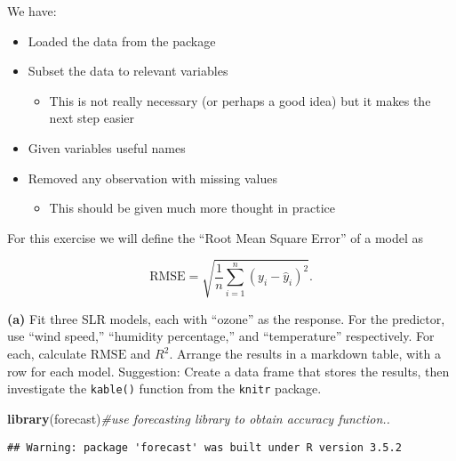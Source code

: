 \documentclass[]{article}
\newenvironment{Shaded}{\begin{snugshade}}{\end{snugshade}}
\newcommand{\KeywordTok}[1]{\textcolor[rgb]{0.13,0.29,0.53}{\textbf{#1}}}
\newcommand{\CommentTok}[1]{\textcolor[rgb]{0.56,0.35,0.01}{\textit{#1}}}
\newcommand{\NormalTok}[1]{#1}
\providecommand{\tightlist}{%
  \setlength{\itemsep}{0pt}\setlength{\parskip}{0pt}}
\begin{document}
We have:

\begin{itemize}
\tightlist
\item
  Loaded the data from the package
\item
  Subset the data to relevant variables

  \begin{itemize}
  \tightlist
  \item
    This is not really necessary (or perhaps a good idea) but it makes
    the next step easier
  \end{itemize}
\item
  Given variables useful names
\item
  Removed any observation with missing values

  \begin{itemize}
  \tightlist
  \item
    This should be given much more thought in practice
  \end{itemize}
\end{itemize}

For this exercise we will define the ``Root Mean Square Error'' of a
model as

\[
\text{RMSE} = \sqrt{\frac{1}{n} \sum_{i = 1}^{n}(y_i - \hat{y}_i)^2}.
\]

\textbf{(a)} Fit three SLR models, each with ``ozone'' as the response.
For the predictor, use ``wind speed,'' ``humidity percentage,'' and
``temperature'' respectively. For each, calculate \(\text{RMSE}\) and
\(R^2\). Arrange the results in a markdown table, with a row for each
model. Suggestion: Create a data frame that stores the results, then
investigate the \texttt{kable()} function from the \texttt{knitr}
package.

\begin{Shaded}
\begin{Highlighting}[]
\KeywordTok{library}\NormalTok{(forecast)}\CommentTok{#use forecasting library to obtain accuracy function..}
\end{Highlighting}
\end{Shaded}

\begin{verbatim}
## Warning: package 'forecast' was built under R version 3.5.2
\end{verbatim}
\end{document}
